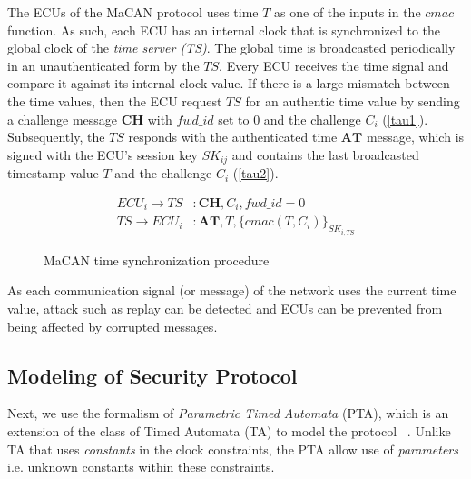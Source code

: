 \vspace*{0.05in}
The ECUs of the MaCAN protocol uses time $T$ as one of the inputs in the $cmac$ function. As such, each ECU has an internal clock that is synchronized to the global clock of the \textit{time server (TS)}. The global time is broadcasted periodically in an unauthenticated form by the $TS$. Every ECU receives the time signal and compare it against its internal clock value. If there is a large mismatch between the time values, then the ECU request $TS$ for an authentic time value by sending a challenge message $\mathbf{CH}$ with $fwd\_id$ set to $0$ and the challenge $C_i$ (\ref{tau1}). Subsequently, the $TS$ responds with the authenticated time $\mathbf{AT}$ message, which is signed with the ECU's session key $SK_{ij}$ and contains the last broadcasted timestamp value $T$ and the challenge $C_i$ (\ref{tau2}).                  

\vspace*{-0.15in}
\begin{figure}[ht]
\begin{align}
 ECU_i \rightarrow TS &: \mathbf{CH}, C_i, fwd\_id = 0 \label{tau1} \\ 
 TS \rightarrow ECU_i &: \mathbf{AT}, T, \{cmac(T, C_i)\}_{SK_{i,TS}} \label{tau2}
\end{align}
\vspace*{-0.2in}
\caption{MaCAN time synchronization procedure} \label{fig:tauth}
\end{figure}

\vspace*{-0.1in}
As each communication signal (or message) of the network uses the current time value, attack such as replay can be detected and ECUs can be prevented from being affected by corrupted messages. 

\subsection{Modeling of Security Protocol}

Next, we use the formalism of \textit{Parametric Timed Automata} (PTA), which is an extension of the class of Timed Automata (TA) to model the protocol ~\cite{BBHBC14}. Unlike TA that uses \textit{constants} in the clock constraints, the PTA allow use of \textit{parameters} i.e. unknown constants within these constraints.

